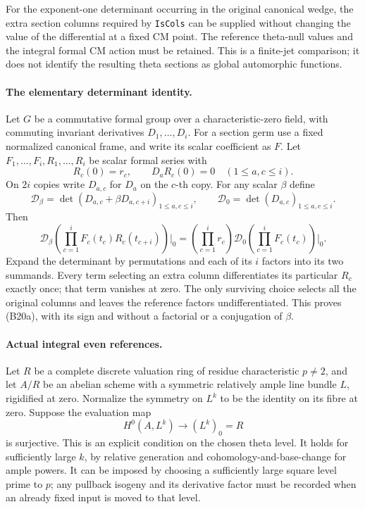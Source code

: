 \documentclass[11pt]{article}
\theoremstyle{definition}\newtheorem{definition}[theorem]{Definition}\newtheorem{remark}[theorem]{Remark}
\begin{document}
For the exponent-one determinant occurring in the original
canonical wedge, the extra section columns required by
\texttt{IsCols} can be supplied without changing the value of
the differential at a fixed CM point.  The reference theta-null
values and the integral formal CM action must be retained.
This is a finite-jet comparison; it does not identify the
resulting theta sections as global automorphic functions.

\paragraph{The elementary determinant identity.}
Let $G$ be a commutative formal group over a characteristic-zero
field, with commuting invariant derivatives $D_1,\ldots,D_i$.
For a section germ use a fixed normalized canonical frame, and
write its scalar coefficient as $F$.
Let $F_1,\ldots,F_i,R_1,\ldots,R_i$ be scalar formal series with
\[
                  R_c(0)=r_c,\qquad D_aR_c(0)=0
                     \quad(1\leq a,c\leq i).
\]
On $2i$ copies write $D_{a,c}$ for $D_a$ on the $c$-th copy.
For any scalar $\beta$ define
\[
 \mathcal D_\beta=
     \det(D_{a,c}+\beta D_{a,c+i})_{1\leq a,c\leq i},
 \qquad
 \mathcal D_0=\det(D_{a,c})_{1\leq a,c\leq i}.
\]
Then
\begin{equation}\label{B20-value}
 \mathcal D_\beta
       \left(\prod_{c=1}^iF_c(t_c)R_c(t_{c+i})\right)\Big|_0
     =\left(\prod_{c=1}^ir_c\right)
          \mathcal D_0\left(\prod_{c=1}^iF_c(t_c)\right)\Big|_0.
 \tag{B20a}
\end{equation}
Expand the determinant by permutations and each of its $i$
factors into its two summands.  Every term selecting an extra
column differentiates its particular $R_c$ exactly once;
that term vanishes at zero.  The only surviving choice selects
all the original columns and leaves the reference factors
undifferentiated.  This proves (B20a), with its sign and without
a factorial or a conjugation of $\beta$.

\paragraph{Actual integral even references.}
Let $R$ be a complete discrete valuation ring of residue
characteristic $p\ne2$, and let $A/R$ be an abelian scheme
with a symmetric relatively ample line bundle $L$, rigidified
at zero.  Normalize the symmetry on $L^k$ to be the identity
on its fibre at zero.  Suppose the evaluation map
\[
                  H^0(A,L^k)\longrightarrow (L^k)_0=R
 \tag{B20b}
\]
is surjective.  This is an explicit condition on the chosen
theta level.  It holds for sufficiently large $k$, by relative
generation and cohomology-and-base-change for ample powers.
It can be imposed by choosing a sufficiently large square
level prime to $p$; any pullback isogeny and its derivative
factor must be recorded when an already fixed input is moved
to that level.
\end{document}

